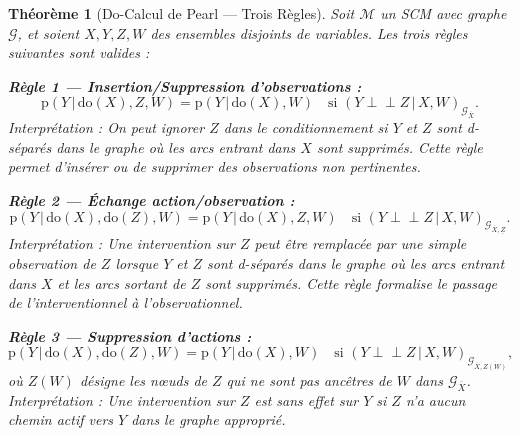 \documentclass[11pt,a4paper]{article}
\newcommand{\rmdo}{\mathrm{do}}
\newcommand{\g}{\,\vert\,}
\newcommand{\pr}{\mathrm{p}}
\newcommand{\Mc}{\mathcal{M}}
\newtheorem{theorem}{Théorème}
\begin{document}
\begin{theorem}[Do-Calcul de Pearl --- Trois Règles]
Soit $\Mc$ un SCM avec graphe $\mathcal{G}$, et soient $X, Y, Z, W$ des ensembles disjoints de variables.
Les trois règles suivantes sont valides :

\medskip
\noindent\textbf{Règle 1 --- Insertion/Suppression d'observations :}
\begin{equation}
  \pr(Y \g \rmdo(X), Z, W) = \pr(Y \g \rmdo(X), W)
  \quad \text{si } (Y \perp\!\!\!\perp Z \g X, W)_{\mathcal{G}_{\overline{X}}}.
  \label{eq:rule1}
\end{equation}
\emph{Interprétation :} On peut ignorer $Z$ dans le conditionnement si $Y$ et $Z$ sont d-séparés dans le graphe où les arcs entrant dans $X$ sont supprimés.
Cette règle permet d'insérer ou de supprimer des observations non pertinentes.

\medskip
\noindent\textbf{Règle 2 --- Échange action/observation :}
\begin{equation}
  \pr(Y \g \rmdo(X), \rmdo(Z), W) = \pr(Y \g \rmdo(X), Z, W)
  \quad \text{si } (Y \perp\!\!\!\perp Z \g X, W)_{\mathcal{G}_{\overline{X},\underline{Z}}}.
  \label{eq:rule2}
\end{equation}
\emph{Interprétation :} Une intervention sur $Z$ peut être remplacée par une simple observation de $Z$ lorsque $Y$ et $Z$ sont d-séparés dans le graphe où les arcs entrant dans $X$ et les arcs sortant de $Z$ sont supprimés.
Cette règle formalise le passage de l'interventionnel à l'observationnel.

\medskip
\noindent\textbf{Règle 3 --- Suppression d'actions :}
\begin{equation}
  \pr(Y \g \rmdo(X), \rmdo(Z), W) = \pr(Y \g \rmdo(X), W)
  \quad \text{si } (Y \perp\!\!\!\perp Z \g X, W)_{\mathcal{G}_{\overline{X}, \overline{Z(W)}}},
  \label{eq:rule3}
\end{equation}
où $Z(W)$ désigne les nœuds de $Z$ qui ne sont pas ancêtres de $W$ dans $\mathcal{G}_{\overline{X}}$.
\emph{Interprétation :} Une intervention sur $Z$ est sans effet sur $Y$ si $Z$ n'a aucun chemin actif vers $Y$ dans le graphe approprié.

\end{theorem}
\end{document}
